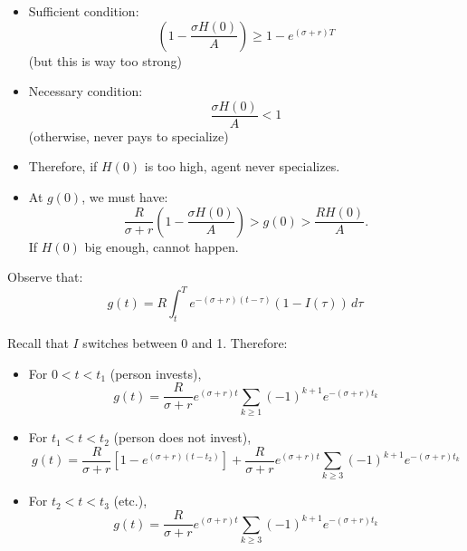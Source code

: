 \documentclass[12pt,compress,handout]{beamer}  %
\begin{document}
\begin{frame}
\begin{itemize}[<+->]
\item Sufficient condition:
  \begin{equation*}
    \left( 1 -\frac{\sigma H(0)}{A} \right) \geq 1 -e^{(\sigma +r)T}
  \end{equation*}
  (but this is way too strong)

  \medskip

\item Necessary condition:
  \begin{equation*}
    \frac{\sigma H(0)}{A} < 1
  \end{equation*}
  (otherwise, never pays to specialize)

  \medskip

\item Therefore, if $H(0)$ is too high, agent never specializes.

  \medskip

\item At $g(0)$, we must have:
  \begin{equation*}
    \frac{R}{\sigma +r} \left( 1 -\frac{\sigma H(0)}{A} \right) >
    g(0) > \frac{R H(0)}{A}.
  \end{equation*}
  If $H(0)$ big enough, cannot happen.
\end{itemize}
\end{frame}


\begin{frame}
Observe that:
\begin{equation*}
    g(t) = R\int_t^T e^{-(\sigma +r)(t-\tau )}(1-I(\tau))\,d\tau
\end{equation*}

Recall that $I$ switches between 0 and 1. Therefore:
\begin{itemize}[<+->]
\item For $0 < t < t_{1}$ (person invests),
  \begin{equation*}
    g(t) = {\textstyle \frac{R}{\sigma +r}} e^{(\sigma +r)t}
    \sum_{k \geq 1} (-1)^{k+1} e^{-(\sigma +r)t_{k}}
  \end{equation*}

\item For $t_{1} < t < t_{2}$ (person does not invest),
  \begin{equation*}
    g(t) = {\textstyle \frac{R}{\sigma +r}} \left[1 - e^{(\sigma +r)(t-t_{2})}\right]
    + {\textstyle \frac{R}{\sigma +r}} e^{(\sigma +r)t}
    \sum_{k \geq 3} (-1)^{k+1} e^{-(\sigma +r)t_{k}}
  \end{equation*}

\item For $t_{2} < t < t_{3}$ (etc.),
  \begin{equation*}
    g(t) = {\textstyle \frac{R}{\sigma +r}} e^{(\sigma +r)t}
    \sum_{k \geq 3} (-1)^{k+1} e^{-(\sigma +r)t_{k}}
  \end{equation*}
\end{itemize}
\end{frame}
\end{document}
